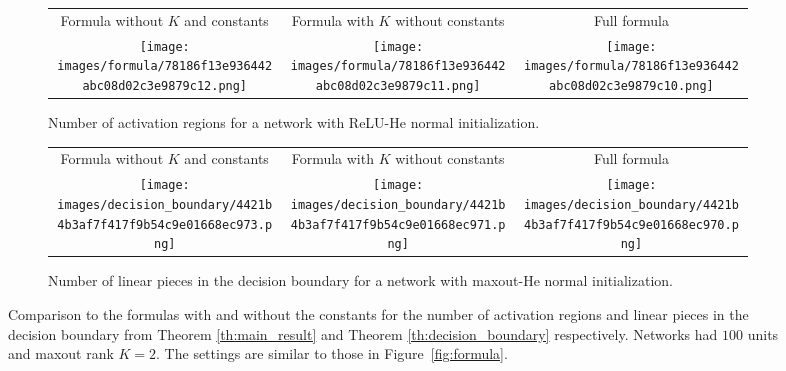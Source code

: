 \documentclass{article}
\theoremstyle{definition}
\begin{document}
\begin{figure}
    \begin{subfigure}{\textwidth}
        \setlength\tabcolsep{2pt}
        \begin{tabular}{ccc}
            \centering
            \small{Formula without $K$ and constants} &
            \small{Formula with $K$ without constants} &
            \small{Full formula} \\
            
            \texttt{[image: images/formula/78186f13e936442abc08d02c3e9879c12.png]} &
            \texttt{[image: images/formula/78186f13e936442abc08d02c3e9879c11.png]} &
            \texttt{[image: images/formula/78186f13e936442abc08d02c3e9879c10.png]}
        \end{tabular}
        \caption{\small Number of activation regions for a network with ReLU-He normal initialization.}
    \end{subfigure}
    \vspace{.2cm}
    
    \begin{subfigure}{\textwidth}
        \setlength\tabcolsep{2pt}
        \begin{tabular}{ccc}
            \centering
            \small{Formula without $K$ and constants} &
            \small{Formula with $K$ without constants} &
            \small{Full formula} \\
            \texttt{[image: images/decision\_boundary/4421b4b3af7f417f9b54c9e01668ec973.png]}&
            \texttt{[image: images/decision\_boundary/4421b4b3af7f417f9b54c9e01668ec971.png]} &
            \texttt{[image: images/decision\_boundary/4421b4b3af7f417f9b54c9e01668ec970.png]}
        \end{tabular}
        \caption{\small Number of linear pieces in the decision boundary for a network with maxout-He normal initialization.}
    \end{subfigure}
    \caption{Comparison to the formulas with and without the constants for the number of activation regions and linear pieces in the decision boundary from Theorem \ref{th:main_result} and Theorem \ref{th:decision_boundary} respectively. Networks had $100$ units and maxout rank $K = 2$. The settings are similar to those in Figure~\ref{fig:formula}.}
    \label{fig:full_formula} 
\end{figure}
\end{document}
